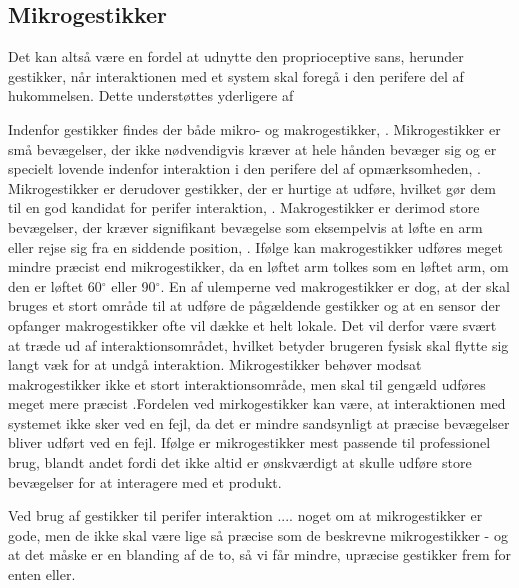 \subsection{Mikrogestikker}
\label{Mikrogestikker}

Det kan altså være en fordel at udnytte den proprioceptive sans, herunder gestikker, når interaktionen med et system skal foregå i den perifere del af hukommelsen. Dette understøttes yderligere af  

Indenfor gestikker findes der både mikro- og makrogestikker, \parencite[s. 6]{PDF:UsabilityofMicroVsMacroGestures}. Mikrogestikker er små bevægelser, der ikke nødvendigvis kræver at hele hånden bevæger sig og er specielt lovende indenfor interaktion i den perifere del af opmærksomheden, \parencite[s. 95]{PDF:PeripheralInteraction}. Mikrogestikker er derudover gestikker, der er hurtige at udføre, hvilket gør dem til en god kandidat for perifer interaktion, \parencite[s. 96]{PDF:PeripheralInteraction}. Makrogestikker er derimod store bevægelser, der kræver signifikant bevægelse som eksempelvis at løfte en arm eller rejse sig fra en siddende position, \parencite[s. 6]{PDF:UsabilityofMicroVsMacroGestures}. Ifølge \textcite[s. 9]{PDF:UsabilityofMicroVsMacroGestures} kan makrogestikker udføres meget mindre præcist end mikrogestikker, da en løftet arm tolkes som en løftet arm, om den er løftet 60$^{\circ}$ eller 90$^{\circ}$. En af ulemperne ved makrogestikker er dog, at der skal bruges et stort område til at udføre de pågældende gestikker og at en sensor der opfanger makrogestikker ofte vil dække et helt lokale. Det vil derfor være svært at træde ud af interaktionsområdet, hvilket betyder brugeren fysisk skal flytte sig langt væk for at undgå interaktion. Mikrogestikker behøver modsat makrogestikker ikke et stort interaktionsområde, men skal til gengæld udføres meget mere præcist \parencite[s. 10]{PDF:UsabilityofMicroVsMacroGestures}.Fordelen ved mirkogestikker kan være, at interaktionen med systemet ikke sker ved en fejl, da det er mindre sandsynligt at præcise bevægelser bliver udført ved en fejl. Ifølge \textcite[s. 10]{PDF:UsabilityofMicroVsMacroGestures} er mikrogestikker mest passende til professionel brug, blandt andet fordi det ikke altid er ønskværdigt at skulle udføre store bevægelser for at interagere med et produkt.

Ved brug af gestikker til perifer interaktion .... noget om at mikrogestikker er gode, men de ikke skal være lige så præcise som de beskrevne mikrogestikker - og at det måske er en blanding af de to, så vi får mindre, upræcise gestikker frem for enten eller.
	